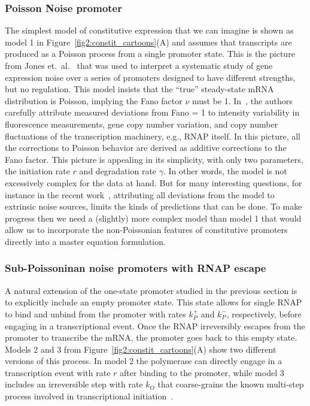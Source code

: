 \subsubsection{Poisson Noise promoter}

The simplest model of constitutive expression that we can imagine is shown as
model 1 in Figure~\ref{fig2:constit_cartoons}(A) and assumes that transcripts
are produced as a Poisson process from a single promoter state. This is the
picture from Jones et.\ al.~\cite{Jones2014} that was used to interpret a
systematic study of gene expression noise over a series of promoters designed to
have different strengths, but no regulation. This model insists that the
``true'' steady-state mRNA distribution is Poisson, implying the Fano factor
$\nu$ must be 1. In~\cite{Jones2014}, the authors carefully attribute measured
deviations from Fano = 1 to intensity variability in fluorescence measurements,
gene copy number variation, and copy number fluctuations of the transcription
machinery, e.g., RNAP itself. In this picture, all the corrections to Poisson
behavior are derived as additive corrections to the Fano factor. This picture is
appealing in its simplicity, with only two parameters, the initiation rate $r$
and degradation rate $\gamma$. In other words, the model is not excessively
complex for the data at hand. But for many interesting questions, for instance
in the recent work~\cite{Razo-Mejia2020}, attributing all deviations from the
model to extrinsic noise sources, limits the kinds of predictions that can be
done. To make progress then we need a (slightly) more complex model than model 1
that would allow us to incorporate the non-Poissonian features of constitutive
promoters directly into a master equation formulation.

\subsubsection{Sub-Poissoninan noise promoters with RNAP escape}
A natural extension of the one-state promoter studied in the previous section is
to explicitly include an empty promoter state. This state allows for single RNAP
to bind and unbind from the promoter with rates $k_P^+$ and $k_P^-$,
respectively, before engaging in a transcriptional event. Once the RNAP
irreversibly escapes from the promoter to transcribe the mRNA, the promoter goes
back to this empty state. Models 2 and 3 from
Figure~\ref{fig2:constit_cartoons}(A) show two different versions of this
process. In model 2 the polymerase can directly engage in a transcription event
with rate $r$ after binding to the promoter, while model 3 includes an
irreversible step with rate $k_O$ that coarse-grains the known multi-step
process involved in transcriptional initiation~\cite{DeHaseth1998}.

